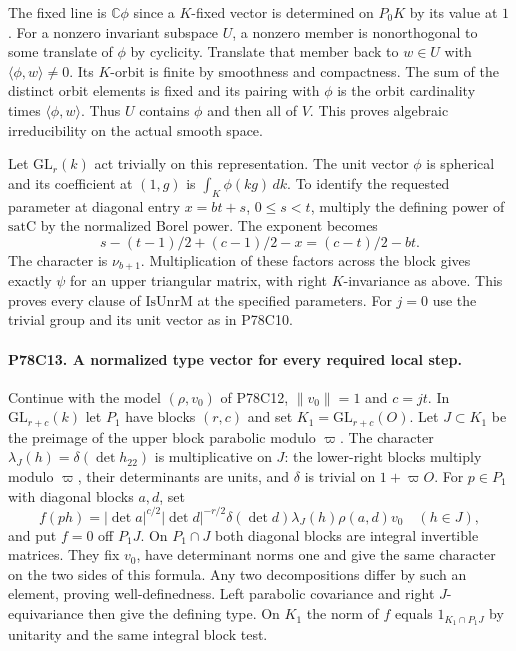 The fixed line is $\mathbb C\phi$ since a $K$-fixed vector is
determined on $P_0K$ by its value at $1$. For a nonzero invariant
subspace $U$, a nonzero member is nonorthogonal to some translate of
$\phi$ by cyclicity. Translate that member back to $w\in U$ with
$\langle\phi,w\rangle\ne0$. Its $K$-orbit is finite by smoothness and
compactness. The sum of the distinct orbit elements is fixed and its
pairing with $\phi$ is the orbit cardinality times
$\langle\phi,w\rangle$. Thus $U$ contains $\phi$ and then all of $V$.
This proves algebraic irreducibility on the actual smooth space.

Let $\mathrm{GL}_r(k)$ act trivially on this representation. The unit
vector $\phi$ is spherical and its coefficient at $(1,g)$ is
$\int_K\phi(kg)\,dk$. To identify the requested parameter at diagonal
entry $x=bt+s$, $0\le s<t$, multiply the defining power of
$\mathrm{satC}$ by the normalized Borel power. The exponent becomes
\[
       s-(t-1)/2+(c-1)/2-x=(c-t)/2-bt.
\]
The character is $\nu_{b+1}$. Multiplication of these factors across
the block gives exactly $\psi$ for an upper triangular matrix, with
right $K$-invariance as above. This proves every clause of
$\mathrm{IsUnrM}$ at the specified parameters. For $j=0$ use the
trivial group and its unit vector as in P78C10.

\paragraph{P78C13. A normalized type vector for every required local step.}
Continue with the model $(\rho,v_0)$ of P78C12, $\|v_0\|=1$ and $c=jt$.
In $\mathrm{GL}_{r+c}(k)$ let $P_1$ have blocks $(r,c)$ and set
$K_1=\mathrm{GL}_{r+c}(O)$. Let $J\subset K_1$ be the preimage
of the upper block parabolic modulo $\varpi$. The character
$\lambda_J(h)=\delta(\det h_{22})$ is multiplicative on $J$:
the lower-right blocks multiply modulo $\varpi$, their determinants
are units, and $\delta$ is trivial on $1+\varpi O$. For $p\in P_1$
with diagonal blocks $a,d$, set
\[
 f(ph)= |\det a|^{c/2}|\det d|^{-r/2}
        \delta(\det d)\lambda_J(h)\rho(a,d)v_0
        \quad(h\in J),
\]
and put $f=0$ off $P_1J$. On $P_1\cap J$ both diagonal blocks are
integral invertible matrices. They fix $v_0$, have determinant norms
one and give the same character on the two sides of this formula.
Any two decompositions differ by such an element, proving
well-definedness. Left parabolic covariance and right $J$-equivariance
then give the defining type. On $K_1$ the norm of $f$ equals
$1_{K_1\cap P_1J}$ by unitarity and the same integral block test.

